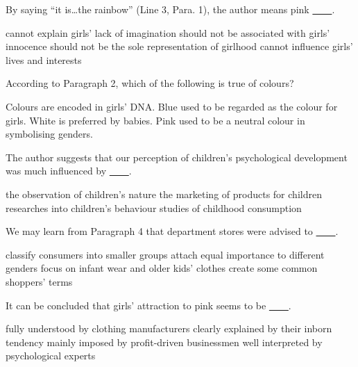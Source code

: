 \item By saying ``it is…the rainbow'' (Line 3, Para. 1), the author means pink \uline{~~~~}.
\begin{tasks}
	\task cannot explain girls' lack of imagination
	\task should not be associated with girls' innocence
	\task should not be the sole representation of girlhood
	\task cannot influence girls' lives and interests
\end{tasks}
\item According to Paragraph 2, which of the following is true of colours?
\begin{tasks}
	\task Colours are encoded in girls' DNA.
	\task Blue used to be regarded as the colour for girls.
	\task White is preferred by babies.
	\task Pink used to be a neutral colour in symbolising genders.
\end{tasks}
\item The author suggests that our perception of children's psychological development was much influenced by \uline{~~~~}.
\begin{tasks}
	\task the observation of children's nature
	\task the marketing of products for children
	\task researches into children's behaviour
	\task studies of childhood consumption
\end{tasks}
\item We may learn from Paragraph 4 that department stores were advised to \uline{~~~~}.
\begin{tasks}
	\task classify consumers into smaller groups
	\task attach equal importance to different genders
	\task focus on infant wear and older kids' clothes
	\task create some common shoppers' terms
\end{tasks}
\item It can be concluded that girls' attraction to pink seems to be \uline{~~~~}.
\begin{tasks}
	\task fully understood by clothing manufacturers
	\task clearly explained by their inborn tendency
	\task mainly imposed by profit-driven businessmen
	\task well interpreted by psychological experts
\end{tasks}